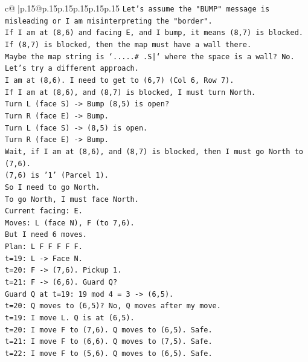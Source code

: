 \documentclass{article}
\begin{document}
{\begin{supertabular}{c@{$\;$}|p{.15\linewidth}@{}p{.15\linewidth}p{.15\linewidth}p{.15\linewidth}p{.15\linewidth}p{.15\linewidth}}
{{{\texttt{Let's assume the "BUMP" message is misleading or I am misinterpreting the "border".} \\
\texttt{If I am at (8,6) and facing E, and I bump, it means (8,7) is blocked.} \\
\texttt{If (8,7) is blocked, then the map must have a wall there.} \\
\texttt{Maybe the map string is `.....\# .S|` where the space is a wall? No.} \\
\texttt{Let's try a different approach.} \\
\texttt{I am at (8,6). I need to get to (6,7) (Col 6, Row 7).} \\
\texttt{If I am at (8,6), and (8,7) is blocked, I must turn North.} \\
\texttt{Turn L (face S) {-}> Bump (8,5) is open?} \\
\texttt{Turn R (face E) {-}> Bump.} \\
\texttt{Turn L (face S) {-}> (8,5) is open.} \\
\texttt{Turn R (face E) {-}> Bump.} \\
\texttt{Wait, if I am at (8,6), and (8,7) is blocked, then I must go North to (7,6).} \\
\texttt{(7,6) is '1' (Parcel 1).} \\
\texttt{So I need to go North.} \\
\texttt{To go North, I must face North.} \\
\texttt{Current facing: E.} \\
\texttt{Moves: L (face N), F (to 7,6).} \\
\texttt{But I need 6 moves.} \\
\texttt{Plan: L F F F F F.} \\
\texttt{t=19: L {-}> Face N.} \\
\texttt{t=20: F {-}> (7,6). Pickup 1.} \\
\texttt{t=21: F {-}> (6,6). Guard Q?} \\
\texttt{Guard Q at t=19: 19 mod 4 = 3 {-}> (6,5).} \\
\texttt{t=20: Q moves to (6,5)? No, Q moves after my move.} \\
\texttt{t=19: I move L. Q is at (6,5).} \\
\texttt{t=20: I move F to (7,6). Q moves to (6,5). Safe.} \\
\texttt{t=21: I move F to (6,6). Q moves to (7,5). Safe.} \\
\texttt{t=22: I move F to (5,6). Q moves to (6,5). Safe.} \\
}}}
\end{supertabular}}
\end{document}
